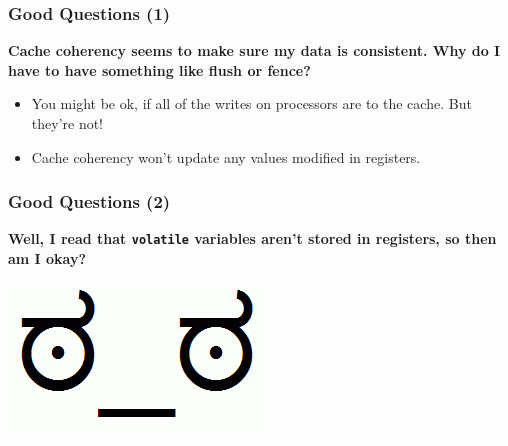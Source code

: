 \documentclass[aspectratio=43]{beamer}
\newenvironment{changemargin}[1]{%
  \begin{list}{}{%
    \setlength{\topsep}{0pt}%
    \setlength{\leftmargin}{#1}%
    \setlength{\rightmargin}{1em}
    \setlength{\listparindent}{\parindent}%
    \setlength{\itemindent}{\parindent}%
    \setlength{\parsep}{\parskip}%
  }%
  \item[]}{\end{list}}
\begin{document}
\begin{frame}
  \frametitle{Good Questions (1)}

  \begin{changemargin}{1cm}
  {\bf Cache coherency seems to make sure my data is consistent. Why do I have
    to have something like flush or fence?}
  \begin{itemize}
    \item You might be ok, if all of the writes on processors are to the
      cache. But they're not!
    \item Cache coherency won't update any values modified in registers.
  \end{itemize}
  \end{changemargin}
\end{frame}

\begin{frame}[fragile]
  \frametitle{Good Questions (2)}

  \begin{changemargin}{1cm}
  {\bf Well, I read that {\tt volatile} variables aren't stored in registers,
    so then am I okay?}
  \vspace{6.2em}
  \pause

  \begin{center}
    \includegraphics[scale=0.3]{L23/disapproval}    
  \end{center}
  \end{changemargin}
\end{frame}
\end{document}

